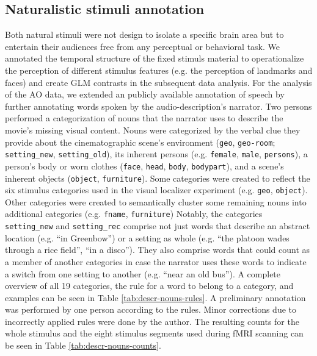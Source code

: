 \documentclass[english]{article}
\begin{document}
\subsection{Naturalistic stimuli annotation}
Both natural stimuli were not design to isolate a specific brain area but to
entertain their audiences free from any perceptual or behavioral task.
We annotated the temporal structure of the fixed stimuls material to
operationalize the perception of different stimulus features (e.g. the
perception of landmarks and faces) and create GLM contrasts in the subsequent
data analysis.
For the analysis of the AO data, we extended an publicly available annotation of
speech \citep{haeusler2020speechanno} by further annotating words spoken by the
audio-description's narrator.
Two persons performed a categorization of nouns that the narrator uses to
describe the movie's missing visual content.
Nouns were categorized by the verbal clue they provide about the cinematographic
scene's environment (\texttt{geo}, \texttt{geo-room}; \texttt{setting\_new},
\texttt{setting\_old}), its inherent persons (e.g. \texttt{female},
\texttt{male}, \texttt{persons}), a person's body or worn clothes
(\texttt{face}, \texttt{head}, \texttt{body}, \texttt{bodypart}), and a scene's
inherent objects (\texttt{object}, \texttt{furniture}).
Some categories were created to reflect the six stimulus categories used in the
visual localizer experiment (e.g. \texttt{geo}, \texttt{object}).
Other categories were created to semantically cluster some remaining nouns into
additional categories (e.g. \texttt{fname}, \texttt{furniture})
Notably, the categories \texttt{setting\_new} and \texttt{setting\_rec} comprise
not just words that describe an abstract location (e.g. ``in Greenbow'') or a
setting as whole (e.g. ``the platoon wades through a rice field'', ``in a
disco''). They also comprise words that could count as a member of another
categories in case the narrator uses these words to indicate a switch from one
setting to another (e.g. ``near an old bus'').
A complete overview of all 19 categories, the rule for a word to belong to a
category, and examples can be seen in Table \ref{tab:descr-nouns-rules}.
A preliminary annotation was performed by one person according to the rules.
Minor corrections due to incorrectly applied rules were done by the author.
The resulting counts for the whole stimulus and the eight stimulus segments used
during fMRI scanning can be seen in Table \ref{tab:descr-nouns-counts}.
\end{document}
